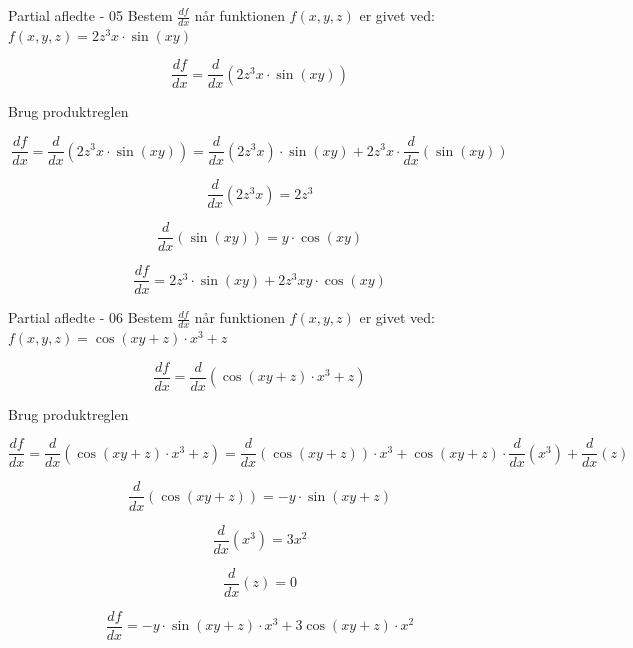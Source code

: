 \documentclass{article}
\begin{document}
\begin{exercise}{Partial afledte - 05}
Bestem $\frac{df}{dx}$ når funktionen $f(x,y,z)$ er givet ved:
$f(x,y,z) = 2z^3x \cdot \sin(xy)$


\hint
\[
\frac{df}{dx} = \frac{d}{dx} \left(2z^3x \cdot \sin(xy)\right)
\]

\hint
Brug produktreglen

\hint
\[
\frac{df}{dx} = \frac{d}{dx} \left( 2z^3x \cdot \sin(xy)\right) = \frac{d}{dx} \left( 2z^3x\right) \cdot \sin(xy) + 2z^3x \cdot \frac{d}{dx}\left( \sin(xy)\right)
\]

\hint
\[
\frac{d}{dx} \left( 2z^3x\right) = 2z^3
\]

\hint
\[
\frac{d}{dx}\left( \sin(xy)\right) = y \cdot \cos(xy)
\]

\hint
\[
\frac{df}{dx} = 2z^3 \cdot \sin(xy) + 2z^3xy \cdot \cos(xy)
\]


\end{exercise}

\begin{exercise}{Partial afledte - 06}
Bestem $\frac{df}{dx}$ når funktionen $f(x,y,z)$ er givet ved:
$f(x,y,z) = \cos(xy + z) \cdot x^3 + z$


\hint
\[
\frac{df}{dx} = \frac{d}{dx} \left( \cos(xy + z) \cdot x^3 + z\right)
\]

\hint
Brug produktreglen

\hint
\[
\frac{df}{dx} = \frac{d}{dx} \left( \cos(xy + z) \cdot x^3 + z\right) = \frac{d}{dx} \left(\cos(xy + z) \right) \cdot x^3 + \cos(xy + z) \cdot \frac{d}{dx}\left( x^3\right) + \frac{d}{dx} (z)
\]

\hint
\[
\frac{d}{dx} \left( \cos(xy + z)\right) = -y \cdot \sin(xy + z)
\]

\hint
\[
\frac{d}{dx}\left( x^3\right) = 3x^2
\]

\hint
\[
\frac{d}{dx} (z) = 0
\]

\hint
\[
\frac{df}{dx} = -y \cdot \sin(xy + z) \cdot x^3 + 3 \cos(xy + z) \cdot x^2
\]


\end{exercise}
\end{document}
